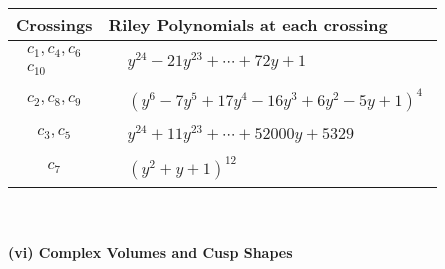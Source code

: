 \documentclass[1p]{elsarticle_modified}
\theoremstyle{definition}
\begin{document}
\begin{tabular}{m{50pt}|m{274pt}}
Crossings & \hspace{64pt}Riley Polynomials at each crossing \\
\hline $$\begin{aligned}c_{1},c_{4},c_{6}\\c_{10}\end{aligned}$$&$\begin{aligned}
&y^{24}-21 y^{23}+\cdots+72 y+1
\end{aligned}$\\
\hline $$\begin{aligned}c_{2},c_{8},c_{9}\end{aligned}$$&$\begin{aligned}
&(y^6-7 y^5+17 y^4-16 y^3+6 y^2-5 y+1)^4
\end{aligned}$\\
\hline $$\begin{aligned}c_{3},c_{5}\end{aligned}$$&$\begin{aligned}
&y^{24}+11 y^{23}+\cdots+52000 y+5329
\end{aligned}$\\
\hline $$\begin{aligned}c_{7}\end{aligned}$$&$\begin{aligned}
&(y^2+y+1)^{12}
\end{aligned}$\\
\hline
\end{tabular}\\~\\
\newpage\flushleft \textbf{(vi) Complex Volumes and Cusp Shapes}
\end{document}

